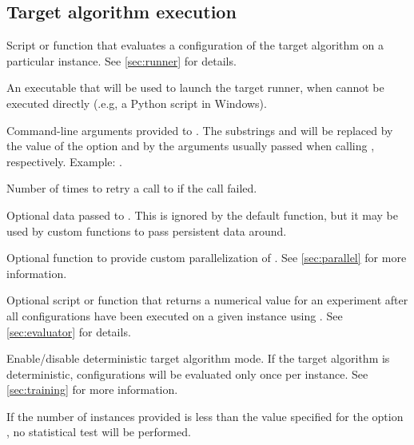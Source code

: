 \subsection[Target algorithm execution]{Target algorithm execution}
\begin{description}
Script or \aR function that evaluates a configuration of the target algorithm on a particular instance. See \autoref{sec:runner} for details.

An executable that will be used to launch the target runner, when  cannot be executed directly (.e.g, a Python script in Windows).

Command-line arguments provided to . The substrings  and  will be replaced by the value of the option  and by the arguments usually passed when calling , respectively. Example: .

Number of times to retry a call to  if the call failed.

Optional data passed to . This is ignored by the default  function, but it may be used by custom  functions to pass persistent data around.

 Optional \aR function to provide custom parallelization of . See \autoref{sec:parallel} for more information.

Optional script or \aR function that returns a numerical value for an experiment after all configurations have been executed on a given instance using . See \autoref{sec:evaluator} for details.

  Enable/disable deterministic target algorithm mode. If the target algorithm is deterministic, configurations will be evaluated only once per instance. See \autoref{sec:training} for more information.
\begin{xwarningbox}
 If the number of instances provided is less than the value specified for the option , no statistical test will be performed.
\end{xwarningbox}


\end{description}

